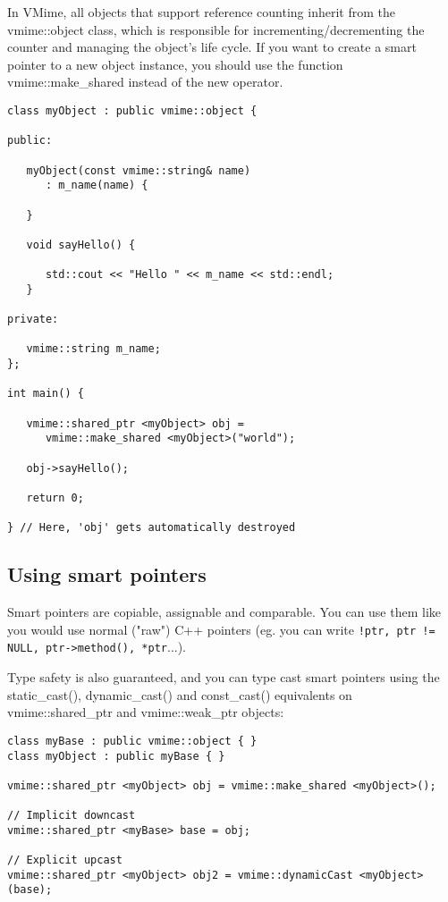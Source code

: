 In VMime, all objects that support reference counting inherit from the
{\vcode vmime::object} class, which is responsible for
incrementing/decrementing the counter and managing the object's life cycle.
If you want to create a smart pointer to a new object instance, you should
use the function {\vcode vmime::make\_shared} instead of the {\vcode new}
operator.

\begin{lstlisting}[caption={Smarts pointers and creating objects}]
class myObject : public vmime::object {

public:

   myObject(const vmime::string& name)
      : m_name(name) {

   }

   void sayHello() {

      std::cout << "Hello " << m_name << std::endl;
   }

private:

   vmime::string m_name;
};

int main() {

   vmime::shared_ptr <myObject> obj =
      vmime::make_shared <myObject>("world");

   obj->sayHello();

   return 0;

} // Here, 'obj' gets automatically destroyed
\end{lstlisting}

\subsection{Using smart pointers} %

Smart pointers are copiable, assignable and comparable. You can use them like
you would use normal ("raw") C++ pointers (eg. you can write
\lstinline{!ptr, ptr != NULL, ptr->method(), *ptr}...).

Type safety is also guaranteed, and you can type cast smart pointers using
the {\vcode static\_cast()}, {\vcode dynamic\_cast()} and {\vcode const\_cast()}
equivalents on {\vcode vmime::shared\_ptr} and {\vcode vmime::weak\_ptr} objects:

\begin{lstlisting}[caption={Casting smart pointers}]
class myBase : public vmime::object { }
class myObject : public myBase { }

vmime::shared_ptr <myObject> obj = vmime::make_shared <myObject>();

// Implicit downcast
vmime::shared_ptr <myBase> base = obj;

// Explicit upcast
vmime::shared_ptr <myObject> obj2 = vmime::dynamicCast <myObject>(base);
\end{lstlisting}

